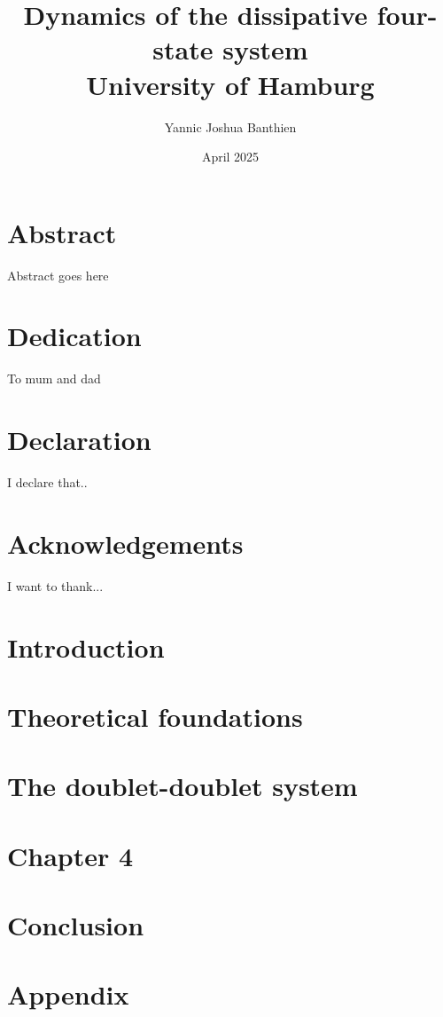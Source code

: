\documentclass[11pt]{report}
\title{
{Dynamics of the dissipative four-state system}\\
{\large University of Hamburg}\\
}
\author{Yannic Joshua Banthien}
\date{April 2025}
\begin{document}
\maketitle

\chapter*{Abstract}
Abstract goes here

\chapter*{Dedication}
To mum and dad

\chapter*{Declaration}
I declare that..

\chapter*{Acknowledgements}
I want to thank...

\tableofcontents

\chapter{Introduction}


\chapter{Theoretical foundations}


\chapter{The doublet-doublet system}


\chapter{Chapter 4}


\chapter{Conclusion}


\appendix
\chapter{Appendix}

\end{document}
